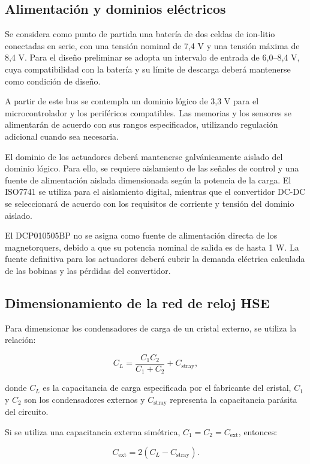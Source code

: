 \documentclass[11pt,a4paper]{article}
\begin{document}
\subsection{Alimentación y dominios eléctricos}

Se considera como punto de partida una batería de dos celdas de
ion-litio conectadas en serie, con una tensión nominal de 7,4 V y
una tensión máxima de 8,4 V. Para el diseño preliminar se adopta
un intervalo de entrada de 6,0--8,4 V, cuya compatibilidad con la
batería y su límite de descarga deberá mantenerse como condición
de diseño.

A partir de este bus se contempla un dominio lógico de 3,3 V para
el microcontrolador y los periféricos compatibles. Las memorias y
los sensores se alimentarán de acuerdo con sus rangos especificados,
utilizando regulación adicional cuando sea necesaria.

El dominio de los actuadores deberá mantenerse galvánicamente
aislado del dominio lógico. Para ello, se requiere aislamiento de
las señales de control y una fuente de alimentación aislada
dimensionada según la potencia de la carga. El ISO7741 se utiliza
para el aislamiento digital, mientras que el convertidor DC-DC se
seleccionará de acuerdo con los requisitos de corriente y tensión
del dominio aislado.

El DCP010505BP no se asigna como fuente de alimentación directa
de los magnetorquers, debido a que su potencia nominal de salida
es de hasta 1 W. La fuente definitiva para los actuadores deberá
cubrir la demanda eléctrica calculada de las bobinas y las pérdidas
del convertidor.

\subsection{Dimensionamiento de la red de reloj HSE}

Para dimensionar los condensadores de carga de un cristal externo,
se utiliza la relación:

\[
C_L =
\frac{C_1 C_2}{C_1+C_2}+C_{\mathrm{stray}},
\]

donde \(C_L\) es la capacitancia de carga especificada por el
fabricante del cristal, \(C_1\) y \(C_2\) son los condensadores
externos y \(C_{\mathrm{stray}}\) representa la capacitancia parásita
del circuito.

Si se utiliza una capacitancia externa simétrica,
\(C_1=C_2=C_{\mathrm{ext}}\), entonces:

\[
C_{\mathrm{ext}}=2(C_L-C_{\mathrm{stray}}).
\]
\end{document}
